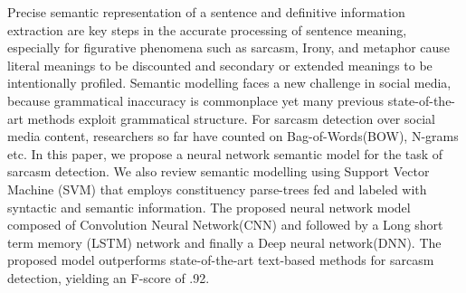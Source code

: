 Precise semantic representation of a sentence and definitive information extraction are key steps in the accurate processing of sentence meaning, especially for figurative phenomena such as sarcasm, Irony, and metaphor cause literal meanings to be discounted and secondary or extended meanings to be intentionally profiled. Semantic modelling faces a new challenge in social media, because grammatical inaccuracy is commonplace yet many previous state-of-the-art methods exploit grammatical structure. For sarcasm detection over social media content, researchers so far have counted on Bag-of-Words(BOW), N-grams etc. In this paper, we propose a neural network semantic model for the task of sarcasm detection. We also review semantic modelling using Support Vector Machine (SVM) that employs constituency parse-trees fed and labeled with syntactic and semantic information. The proposed neural network model composed of Convolution Neural Network(CNN) and followed by a Long short term memory (LSTM) network and finally a Deep neural network(DNN). The proposed model outperforms state-of-the-art text-based methods for sarcasm detection, yielding an F-score of .92.
